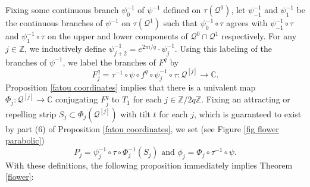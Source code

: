 \documentclass[12pt,letterpaper]{amsart}
\numberwithin{equation}{section}
\newtheorem{prop}[equation]{Proposition}
\theoremstyle{remark}
\theoremstyle{definition}
\newcommand{\C}{\mathbb C}
\newcommand{\Z}{\mathbb Z}
\newcommand{\QQ}{\mathcal Q}
\begin{document}
	Fixing some continuous branch $\psi_0^{-1}$ of $\psi^{-1}$ defined on $\tau(\QQ^0)$, let $\psi_{-1}^{-1}$ and $\psi_{1}^{-1}$ be the continuous branches of $\psi^{-1}$ on $\tau(\QQ^1)$ 
	such that $\psi^{-1}_0\circ \tau$ agrees with $\psi_{-1}^{-1}\circ \tau$ and $\psi_{1}^{-1}\circ \tau$ on the upper and lower components of $\QQ^0\cap \QQ^1$ respectively. 
	For any $j\in \Z$, we inductively define $\psi_{j+2}^{-1} = e^{2\pi i /q}\cdot \psi_j^{-1}$. 
	Using this labeling of the branches of $\psi^{-1}$, we label the branches of ${F}^q$ by 
%	
%	
%	
 $${F}^q_j= \tau^{-1}\circ \psi\circ f^q\circ \psi_j^{-1}\circ \tau: \QQ^{[j]}\to \C.$$
%	
	Proposition \ref{fatou coordinates} implies that
	there is a univalent map $\Phi_j: \QQ^{[j]}\to \C$  conjugating ${F}^q_j$ to $T_1$
	for each $j\in \Z/2q\Z$.
	Fixing an attracting or repelling strip $S_j\subset \Phi_j(\QQ^{[j]})$ with tilt $t$  for each $j$, which is guaranteed to exist  by part (6) of Proposition \ref{fatou coordinates}, we set (see Figure \ref{fig flower parabolic})
	$$P_j = \psi_j^{-1}\circ \tau\circ \Phi_j^{-1}(S_j) \text{ and }\phi_j=\Phi_j\circ\tau^{-1}\circ \psi.$$
	With these definitions, the following proposition immediately implies Theorem \ref{flower}:
	
\end{document}
